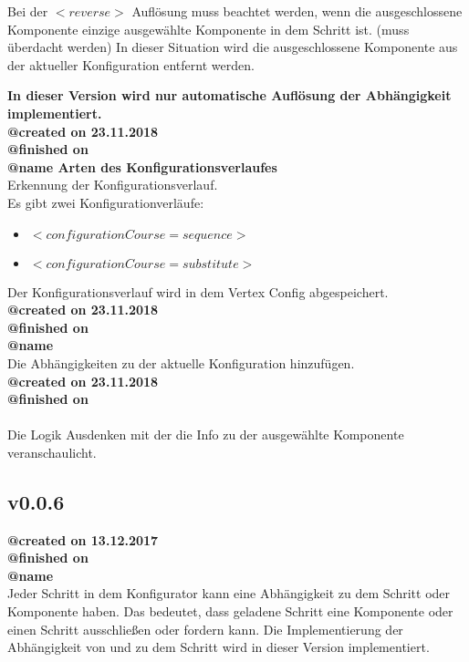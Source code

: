 \documentclass{article}
\begin{document}
Bei der $<reverse>$ Auflösung muss beachtet werden, wenn die ausgeschlossene Komponente einzige 
ausgewählte Komponente in dem Schritt ist. (muss überdacht werden) In dieser Situation wird die 
ausgeschlossene Komponente aus der aktueller Konfiguration entfernt werden.  


\noindent\textbf{In dieser Version wird nur automatische Auflösung der Abhängigkeit implementiert.}\\

\noindent\textbf{@created on 23.11.2018}\\
\textbf{@finished on }\\
\textbf{@name Arten des Konfigurationsverlaufes}\\

\noindent Erkennung der Konfigurationsverlauf.\\
Es gibt zwei Konfigurationverläufe: 

\begin{itemize}
	\item $<configurationCourse=sequence>$
	\item $<configurationCourse=substitute>$
\end{itemize}
\noindent Der Konfigurationsverlauf wird in dem Vertex Config abgespeichert. \\

\noindent \textbf{@created on 23.11.2018}\\
\textbf{@finished on }\\
\textbf{@name}\\

\noindent Die Abhängigkeiten zu der aktuelle Konfiguration hinzufügen.\\

\noindent \textbf{@created on 23.11.2018}\\
\textbf{@finished on }\\\\
Die Logik Ausdenken mit der die Info zu der ausgewählte Komponente veranschaulicht.\\

\subsection{v0.0.6}

\textbf{@created on 13.12.2017}\\
\textbf{@finished on} \\
\textbf{@name }\\

\noindent Jeder Schritt in dem Konfigurator kann eine Abhängigkeit zu dem Schritt oder
Komponente haben. Das bedeutet, dass geladene Schritt eine Komponente oder einen
Schritt ausschließen oder fordern kann. Die Implementierung der Abhängigkeit von und zu
dem Schritt wird in dieser Version implementiert.\\
\end{document}
